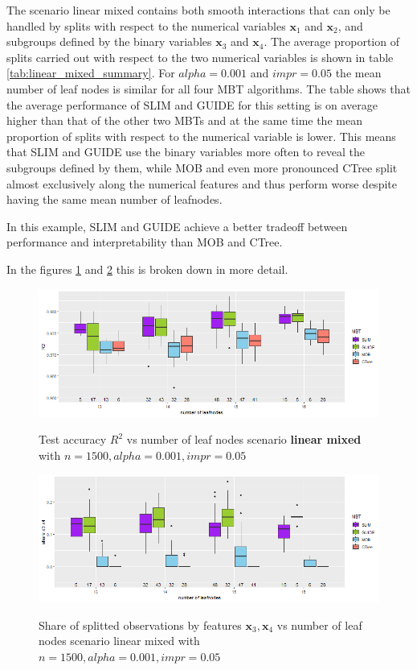 The scenario linear mixed contains both smooth interactions that can only be handled by splits with respect to the numerical variables $\textbf{x}_1$ and $\textbf{x}_2$, and subgroups defined by the binary variables $\textbf{x}_3$ and $\textbf{x}_4$. 
The average proportion of splits carried out with respect to the two numerical variables is shown in table \ref{tab:linear_mixed_summary}.
For $alpha = 0.001$ and $impr = 0.05$ the mean number of leaf nodes is similar for all four MBT algorithms. The table shows that the average performance of SLIM and GUIDE for this setting is on average higher than that of the other two MBTs and at the same time the mean proportion of splits with respect to the numerical variable is lower.  This means that SLIM and GUIDE use the binary variables more often to reveal the subgroups defined by them, while MOB and even more pronounced CTree split almost exclusively along the numerical features and thus perform worse despite having the same mean number of leafnodes. 

In this example, SLIM and GUIDE achieve a better tradeoff between performance and interpretability than MOB and CTree.


In the figures \ref{fig:lm_1000_standalone_r2_test}  and \ref{fig:lm_1000_standalone_share_x3x4} this is broken down in more detail.


\begin{figure}[!htb]
\caption{Test accuracy $R^2$ vs number of leaf nodes scenario \textbf{linear mixed} with $n=1500, alpha = 0.001, impr = 0.05$}
    \includegraphics[width=16cm]{Figures/simulations/batchtools/basic_scenarios/linear_mixed/lm_1000_standalone_r2_test.png}
    \label{fig:lm_1000_standalone_r2_test}
\end{figure} 


\begin{figure}[!htb]
\caption{Share of splitted observations by features $\textbf{x}_3, \textbf{x}_4$ vs number of leaf nodes scenario linear mixed with $n=1500, alpha = 0.001, impr = 0.05$}
    \includegraphics[width=16cm]{Figures/simulations/batchtools/basic_scenarios/linear_mixed/lm_1000_standalone_share_x3x4.png}
    \label{fig:lm_1000_standalone_share_x3x4}
\end{figure} 




